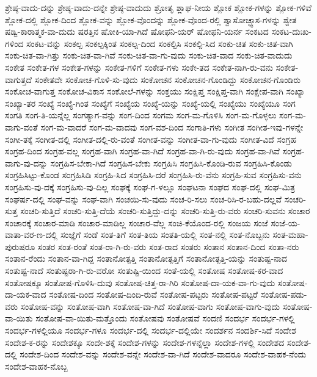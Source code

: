 {ಶ್ರೇಷ್ಠ-ವಾದು-ದನ್ನು
ಶ್ರೇಷ್ಠ-ವಾದು-ದನ್ನೇ
ಶ್ರೇಷ್ಠ-ವಾದುದು
ಶ್ರೋತೃ
ಶ್ಲಾಘ-ನೀಯ
ಶ್ಲೋಕ
ಶ್ಲೋಕ-ಗಳನ್ನು
ಶ್ಲೋಕ-ಗಳಿವೆ
ಶ್ಲೋಕ-ದಲ್ಲಿ
ಶ್ಲೋಕ-ದಿಂದ
ಶ್ಲೋಕ-ವನ್ನು
ಶ್ಲೋಕ-ವೊಂದನ್ನು
ಶ್ಲೋಕ-ವೊಂದ-ರಲ್ಲಿ
ಶ್ವಾಸೋಚ್ಫ್ವಾಸ-ಗಳನ್ನು
ಶ್ವೇತ
ಷಡ್ವಿ-ಕಾರಾತ್ಮಕ-ವಾ-ದುದು
ಷರತ್ತಿನ
ಷೋಕಿ-ಯಾ-ಗಿದೆ
ಷೋಫನಿ-ಯರ್
ಷೋಫನಿ-ಯರ್ನ
ಸಂಕಟದ
ಸಂಕಟ-ದುಃಖ-ಗಳಿಂದ
ಸಂಕಟ-ವನ್ನು
ಸಂಕಲ್ಪ
ಸಂಕಲ್ಪಕ್ಕಿಂತ
ಸಂಕಲ್ಪ-ದಿಂದ
ಸಂಕಲ್ಪಿಸಿ
ಸಂಕಲ್ಪಿ-ಸಿದ
ಸಂಕು-ಚಿತ
ಸಂಕು-ಚಿತ-ವಾಗಿ
ಸಂಕು-ಚಿತ-ವಾ-ಗಿತ್ತು
ಸಂಕು-ಚಿತ-ವಾ-ಗಿವೆ
ಸಂಕು-ಚಿತ-ವಾ-ಗು-ವುದು
ಸಂಕು-ಚಿತ-ವಾದ
ಸಂಕು-ಚಿತ-ವಾದುದು
ಸಂಕೇತ
ಸಂಕೇತ-ಗಳ
ಸಂಕೇತ-ಗಳನ್ನು
ಸಂಕೇತ-ಗಳಿಗೆ
ಸಂಕೇತ-ಗಳು
ಸಂಕೇ-ತದ
ಸಂಕೇತ-ನಾಗಿ-ರು-ವನು
ಸಂಕೇತ-ವಾಗುತ್ತದೆ
ಸಂಕೇತವೇ
ಸಂಕೋಚ-ಗೊಳಿ-ಸು-ವುದು
ಸಂಕೋಚನ
ಸಂಕೋಚನ-ಗೊಂಡಿದ್ದು
ಸಂಕೋಚನ-ಗೊಂಡಿರು
ಸಂಕೋಚ-ವಾಗುತ್ತ
ಸಂಕೋಚ-ವಿಕಾಸ
ಸಂಕೋಲೆ-ಗಳನ್ನು
ಸಂಕ್ತಯು
ಸಂಕ್ಷಿಪ್ತ
ಸಂಕ್ಷಿಪ್ತ-ವಾಗಿ
ಸಂಕ್ಷೇಪ-ವಾಗಿ
ಸಂಖ್ಯಾ
ಸಂಖ್ಯಾ-ತರ
ಸಂಖ್ಯೆ
ಸಂಖ್ಯೆ-ಗಿಂತ
ಸಂಖ್ಯೆಗೆ
ಸಂಖ್ಯೆಯ
ಸಂಖ್ಯೆ-ಯನ್ನು
ಸಂಖ್ಯೆ-ಯಲ್ಲಿ
ಸಂಖ್ಯೆಯು
ಸಂಖ್ಯೆಯೂ
ಸಂಗ
ಸಂಗತಿ
ಸಂಗ-ತಿ-ಯನ್ನೆಲ್ಲ
ಸಂಗತ್ಯಾಗ-ವನ್ನು
ಸಂಗ-ದಿಂದ
ಸಂಗಮ
ಸಂಗ-ಮ-ಗೊಳಿಸಿ
ಸಂಗ-ಮ-ಗೊಳ್ಳಲು
ಸಂಗ-ಮ-ವಾಗು-ವಂತೆ
ಸಂಗ-ಮ-ವಾದರೆ
ಸಂಗ-ಮ-ವಾದವು
ಸಂಗ-ವಶ-ದಿಂದ
ಸಂಗಾತಿ-ಗಳು
ಸಂಗೀತ
ಸಂಗೀತ-ಇವು-ಗಳನ್ನೇ
ಸಂಗೀ-ತಕ್ಕೆ
ಸಂಗೀತ-ದಲ್ಲಿ
ಸಂಗೀತ-ದಲ್ಲಿ-ರು-ವಂತೆ
ಸಂಗೀತ-ವನ್ನು
ಸಂಗೀತ-ವಾ-ಗು-ವುದು
ಸಂಗೀತ-ವಿದೆ
ಸಂಗ್ರಹ
ಸಂಗ್ರಹ-ದಿಂದ
ಸಂಗ್ರಹ-ವಲ್ಲ
ಸಂಗ್ರಹ-ವಾಗಿ
ಸಂಗ್ರಹ-ವಾ-ಗಿದೆ
ಸಂಗ್ರಹ-ವಾ-ಗಿ-ರು-ವುದು
ಸಂಗ್ರಹ-ವಾ-ಗಿವೆ
ಸಂಗ್ರಹ-ವಾಗು-ವು-ದನ್ನು
ಸಂಗ್ರಹಿಸ-ಬೇಕಾ-ಗಿದೆ
ಸಂಗ್ರಹಿಸ-ಬೇಕು
ಸಂಗ್ರಹಿಸಿ
ಸಂಗ್ರಹಿಸಿ-ಕೊಂಡಿ-ರುವ
ಸಂಗ್ರಹಿಸಿ-ಕೊಂಡು
ಸಂಗ್ರಹಿಸಿಟ್ಟು-ಕೊಂಡ
ಸಂಗ್ರಹಿಸಿಡಿ
ಸಂಗ್ರಹಿ-ಸಿದ
ಸಂಗ್ರಹಿಸಿ-ದರೆ
ಸಂಗ್ರಹಿಸಿ-ರು-ವೆನು
ಸಂಗ್ರಹಿ-ಸುವ
ಸಂಗ್ರಹಿಸು-ವನು
ಸಂಗ್ರಹಿಸು-ವು-ದಕ್ಕೆ
ಸಂಗ್ರಹಿಸು-ವು-ದಿಲ್ಲ
ಸಂಘಕ್ಕೆ
ಸಂಘ-ಗ-ಳಲ್ಲೂ
ಸಂಘಟನಾ
ಸಂಘದ
ಸಂಘ-ದಲ್ಲಿ
ಸಂಘ-ಮಿತ್ರ
ಸಂಘರ್ಷ-ದಲ್ಲಿ
ಸಂಘ-ವನ್ನು
ಸಂಘ-ವಾಗಿ
ಸಂಚಯಿ-ಸು-ವುದು
ಸಂಚ-ರಿ-ಸಲು
ಸಂಚ-ರಿಸಿ-ರ-ಬಹು-ದಲ್ಲವೆ
ಸಂಚರಿ-ಸುತ್ತ
ಸಂಚರಿ-ಸುತ್ತಿದೆ
ಸಂಚರಿ-ಸುತ್ತಿ-ದೆಯೆ
ಸಂಚರಿ-ಸುತ್ತಿದ್ದು-ದನ್ನು
ಸಂಚರಿ-ಸುತ್ತಿ-ರು-ವರು
ಸಂಚರಿ-ಸುವನು
ಸಂಚಾರ
ಸಂಚಾರಕ್ಕೆ
ಸಂಚಾರ-ಮಾಡಿ
ಸಂಚಾರ-ಮಾಡಿಲ್ಲ
ಸಂಚಾರ-ವೆಲ್ಲ
ಸಂಚಿ-ಕೆಯೊಂದ-ರಲ್ಲಿ
ಸಂಜಯ
ಸಂಜೆ
ಸಂಜೆ-ಯ-ವಾತಾ-ವರ-ಣ-ದಲ್ಲಿ
ಸಂಜ್ಞೆಗೆ
ಸಂಡೆ
ಸಂತ-ತಿಗೆ
ಸಂತ-ತಿಯ
ಸಂತತಿ-ಯಲ್ಲಿ
ಸಂತ-ನಲ್ಲಿ
ಸಂತ-ನೊಬ್ಬನು
ಸಂತ-ಮಹಾ-ಪುರುಷರೂ
ಸಂತರ
ಸಂತ-ರಂತೆ
ಸಂತ-ರಾ-ಗಿ-ರು-ವರು
ಸಂತ-ರಾದ
ಸಂತರು
ಸಂತಾನ
ಸಂತಾನ-ದಿಂದ
ಸಂತಾ-ನರು
ಸಂತಾನ-ರೆಂದು
ಸಂತಾನ-ವಾ-ಗಿದ್ದ
ಸಂತಾನೋತ್ಪತ್ತಿ
ಸಂತಾನೋತ್ಪತ್ತಿಗೆ
ಸಂತಾನೋತ್ಪತ್ತಿ-ಯನ್ನು
ಸಂತುಷ್ಟ-ನಾದ
ಸಂತುಷ್ಟ-ನಾದೆ
ಸಂತುಷ್ಟರಾ-ಗಿ-ರು-ವರೋ
ಸಂತುಷ್ಟಿ-ಯಿಂದ
ಸಂತೆ-ಯಲ್ಲಿ
ಸಂತೋಷ
ಸಂತೋಷ-ಕರ-ವಾದ
ಸಂತೋಷಕ್ಕೂ
ಸಂತೋಷ-ಗೊಳಿಸಿ-ದುವು
ಸಂತೋಷ-ಚಿತ್ತ-ರಾ-ಗಿರಿ
ಸಂತೋಷ-ದಾ-ಯಕ-ವಾ-ಗು-ವುದು
ಸಂತೋಷ-ದಾ-ಯಕ-ವಾದ
ಸಂತೋಷ-ದಿಂದ
ಸಂತೋಷ-ದಿಂದಿ-ರುವೆ
ಸಂತೋಷ-ಪಟ್ಟರು
ಸಂತೋಷ-ಪಟ್ಟರೆ
ಸಂತೋಷ-ಪಡು-ವರು
ಸಂತೋಷ-ವನ್ನು
ಸಂತೋಷ-ವಾಗಿ
ಸಂತೋಷ-ವಾ-ಗಿದೆ
ಸಂತೋಷ-ವಾಗು
ಸಂತೋಷ-ವಾಗು-ವುದು
ಸಂತೋಷ-ವಾ-ಯಿತು
ಸಂತೋಷ-ವಾ-ಯಿತು-ಮತ್ತೊಂದು
ಸಂತೋಷವು
ಸಂತೋಷವೆ
ಸಂದಣಿ
ಸಂದರ್ಭ
ಸಂದರ್ಭ-ಗಳಲ್ಲಿ
ಸಂದರ್ಭ-ಗಳಲ್ಲಿಯೂ
ಸಂದರ್ಭ-ಗಳೂ
ಸಂದರ್ಭ-ದಲ್ಲಿ
ಸಂದರ್ಭ-ದಲ್ಲಿಯೇ
ಸಂದರ್ಶನ
ಸಂದರ್ಶಿ-ಸಿದೆ
ಸಂದೇಶ
ಸಂದೇಶ-ಕ-ರನ್ನು
ಸಂದೇಶಕ್ಕೂ
ಸಂದೇ-ಶಕ್ಕೆ
ಸಂದೇಶ-ಗಳನ್ನು
ಸಂದೇಶ-ಗಳನ್ನೆಲ್ಲಾ
ಸಂದೇಶ-ಗಳಲ್ಲಿ
ಸಂದೇಶದ
ಸಂದೇಶ-ದಲ್ಲಿ
ಸಂದೇಶ-ದಿಂದ
ಸಂದೇಶ-ವನ್ನು
ಸಂದೇಶ-ವನ್ನೇ
ಸಂದೇಶ-ವಾ-ಗಿದೆ
ಸಂದೇಶ-ವಾದರೂ
ಸಂದೇಶ-ವಾಹಕ-ನೆಂದು
ಸಂದೇಶ-ವಾಹಕ-ನೊಬ್ಬ
}
